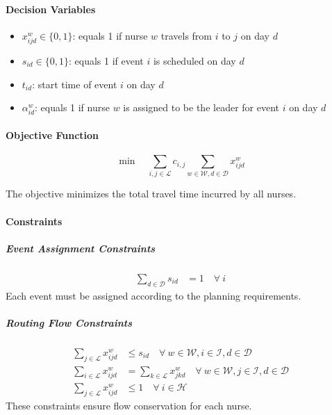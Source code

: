 \paragraph{Decision Variables}
\begin{itemize}
    \item $x_{ijd}^{w} \in \{0,1\}$: equals 1 if nurse $w$ travels from $i$ to $j$ on day $d$
    \item $s_{id} \in \{0,1\}$: equals 1 if event $i$ is scheduled on day $d$
    \item $t_{id}$: start time of event $i$ on day $d$
    \item $\alpha_{id}^w$: equals 1 if nurse $w$ is assigned to be the leader for event $i$ on day $d$
\end{itemize}

\paragraph{Objective Function}
\begin{equation}
\min \quad \sum_{i,j \in \mathcal{L}} c_{i,j} \sum_{w \in \mathcal{W},d \in \mathcal{D}} x_{ijd}^{w}
\label{obj:base}
\end{equation}

The objective minimizes the total travel time incurred by all nurses.

\paragraph{Constraints}

\subparagraph{Event Assignment Constraints}
\begin{align}
\sum_{d \in \mathcal{D}} s_{id} &= 1 \quad \forall \ i
\end{align}
Each event must be assigned according to the planning requirements.

\subparagraph{Routing Flow Constraints}
\begin{align}
\sum_{j\in \mathcal{L}} x_{ijd}^w &\leq s_{id} \quad \forall \ w \in \mathcal{W}, i\in\mathcal{I}, d\in\mathcal{D} \\
\sum_{i\in\mathcal{L}} x_{ijd}^w &= \sum_{k\in\mathcal{L}} x_{jkd}^w \quad \forall \ w \in \mathcal{W}, j\in\mathcal{I}, d\in\mathcal{D}\\
\sum_{j\in \mathcal{L}} x_{ijd}^w &\leq 1 \quad \forall \ i \in \mathcal{H}
\end{align}
These constraints ensure flow conservation for each nurse.

